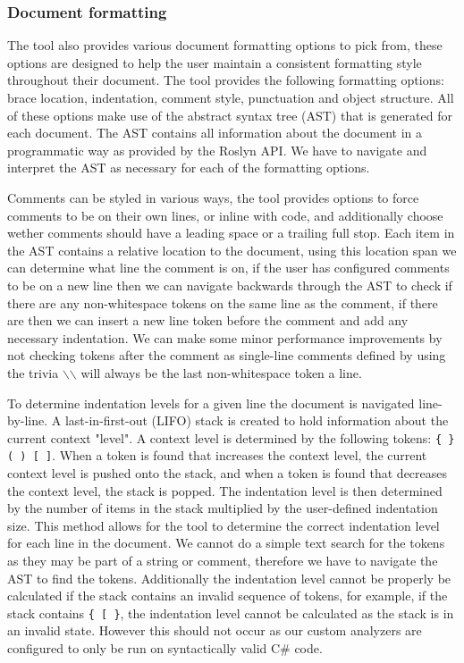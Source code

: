 \subsubsection{Document formatting}
The tool also provides various document formatting options to pick from, these options are designed to help the user maintain a consistent formatting style throughout their document. The tool provides the following formatting options: brace location, indentation, comment style, punctuation and object structure. All of these options make use of the abstract syntax tree (AST) that is generated for each document. The AST contains all information about the document in a programmatic way as provided by the Roslyn API. We have to navigate and interpret the AST as necessary for each of the formatting options.

Comments can be styled in various ways, the tool provides options to force comments to be on their own lines, or inline with code, and additionally choose wether comments should have a leading space or a trailing full stop. Each item in the AST contains a relative location to the document, using this location span we can determine what line the comment is on, if the user has configured comments to be on a new line then we can navigate backwards through the AST to check if there are any non-whitespace tokens on the same line as the comment, if there are then we can insert a new line token before the comment and add any necessary indentation. We can make some minor performance improvements by not checking tokens after the comment as single-line comments defined by using the trivia \texttt{$\backslash$$\backslash$} will always be the last non-whitespace token a line.

To determine indentation levels for a given line the document is navigated line-by-line. A last-in-first-out (LIFO) stack is created to hold information about the current context "level". A context level is determined by the following tokens: \texttt{\{ \} ( ) [ ]}. When a token is found that increases the context level, the current context level is pushed onto the stack, and when a token is found that decreases the context level, the stack is popped. The indentation level is then determined by the number of items in the stack multiplied by the user-defined indentation size. This method allows for the tool to determine the correct indentation level for each line in the document.
We cannot do a simple text search for the tokens as they may be part of a string or comment, therefore we have to navigate the AST to find the tokens. Additionally the indentation level cannot be properly be calculated if the stack contains an invalid sequence of tokens, for example, if the stack contains \texttt{\{ [ \}}, the indentation level cannot be calculated as the stack is in an invalid state. However this should not occur as our custom analyzers are configured to only be run on syntactically valid C\# code.

